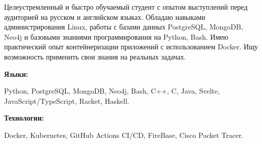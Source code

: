 \documentclass[9pt]{developercv} %
\begin{document}
\begin{minipage}[t]{0.46\textwidth}
	\vspace{-6pt}

	Целеустремленный и быстро обучаемый студент с опытом выступлений перед аудиторией на русском и английском языках. Обладаю навыками администрирования Linux, работы с базами данных PostgreSQL, MongoDB, Neo4j и базовыми знаниями программирования на Python, Bash. Имею практический опыт контейнеризации приложений с использованием Docker. Ищу возможность применить свои знания на реальных задачах.
\end{minipage}
\hfill %
\begin{minipage}[t]{0.465\textwidth}
    \vspace{-6pt}
    
    \begin{minipage}[t]{0.2\textwidth}
        \textbf{Языки:}
    \end{minipage}
    \hfill
    \begin{minipage}[t]{0.73\textwidth}
       Python, PostgreSQL,  MongoDB, Neo4j, Bash,   C++, C, Java,  Svelte, JavaScript/TypeScript, Racket, Haskell.
    \end{minipage}
    \vspace{4mm}
    
    \begin{minipage}[t]{0.2\textwidth}
        \textbf{Технологии:}
    \end{minipage}
    \hfill
    \begin{minipage}[t]{0.73\textwidth}
       Docker, Kubernetes, GitHub Actions CI/CD, FireBase, Cisco Packet Tracer.
    \end{minipage}
    
\end{minipage}
\end{document}
